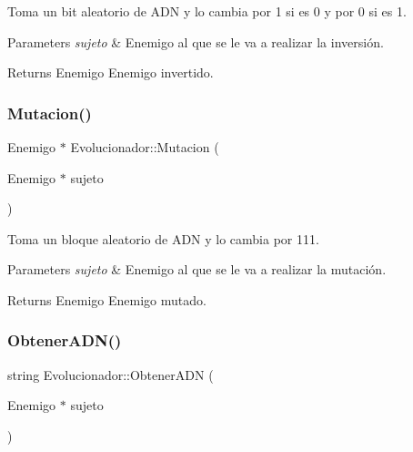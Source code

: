 Toma un bit aleatorio de A\+DN y lo cambia por 1 si es 0 y por 0 si es 1. 


\begin{DoxyParams}{Parameters}
{\em sujeto} & Enemigo al que se le va a realizar la inversión. \\
\hline
\end{DoxyParams}
\begin{DoxyReturn}{Returns}
Enemigo Enemigo invertido. 
\end{DoxyReturn}
\mbox{\label{classEvolucionador_a75021ad99b4f7de2005e75b37c1b3514}} 
\subsubsection{\texorpdfstring{Mutacion()}{Mutacion()}}
{\footnotesize\ttfamily Enemigo $\ast$ Evolucionador\+::\+Mutacion (\begin{DoxyParamCaption}\item[{Enemigo $\ast$}]{sujeto }\end{DoxyParamCaption})}



Toma un bloque aleatorio de A\+DN y lo cambia por 111. 


\begin{DoxyParams}{Parameters}
{\em sujeto} & Enemigo al que se le va a realizar la mutación. \\
\hline
\end{DoxyParams}
\begin{DoxyReturn}{Returns}
Enemigo Enemigo mutado. 
\end{DoxyReturn}
\mbox{\label{classEvolucionador_a6ede9c321c7f3687a94ccf67c00c8b80}} 
\subsubsection{\texorpdfstring{Obtener\+A\+D\+N()}{ObtenerADN()}}
{\footnotesize\ttfamily string Evolucionador\+::\+Obtener\+A\+DN (\begin{DoxyParamCaption}\item[{Enemigo $\ast$}]{sujeto }\end{DoxyParamCaption})}



